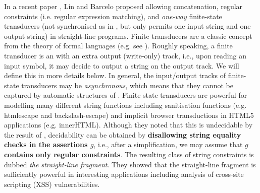{In a recent paper \cite{LB16}, Lin and Barcelo 
proposed allowing concatenation, regular constraints (i.e. regular expression 
matching), and \emph{one-way} finite-state transducers (not synchronised as in \cite{BTV09}, but only permits one input string and one output string) in 
straight-line programs. Finite transducers are a classic concept from
the theory of formal languages (e.g. see \cite{Berstel}).
Roughly speaking, a finite transducer is an \FA{} with an extra output (write-only) 
track, i.e., upon reading an input symbol, it may decide to output a string 
on the output track. We will define this in more details below.
In general, the input/output tracks of finite-state transducers may be 
\emph{asynchronous}, which means that they cannot be captured by automatic structures of \cite{BG04}. 
Finite-state transducers are powerful for modelling many
different string functions including sanitisation functions (e.g. htmlescape and
backslash-escape) and implicit browser transductions in HTML5 applications (e.g.
innerHTML). Although they noted that this is
undecidable by the result of \cite{BFL13}, decidability can be obtained 
by {\bf disallowing string equality checks in the assertions $g$}, i.e., after
a simplification, we may assume that {\bf $g$ contains only regular constraints}.
The 
resulting class of string constraints is dubbed \emph{the straight-line 
fragment}.
They showed that the straight-line fragment is sufficiently powerful in
interesting applications including analysis of cross-site scripting (XSS)
vulnerabilities. 
}


